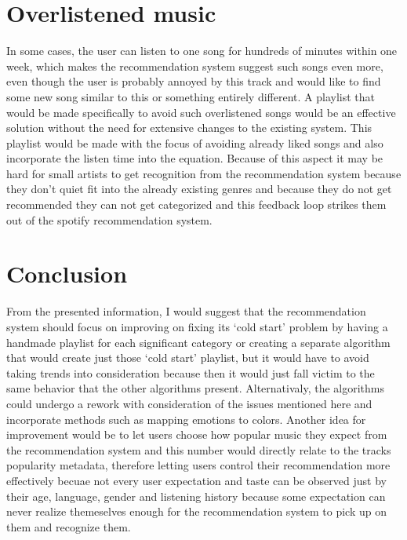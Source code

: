 \documentclass[10pt,twoside,slovak,a4paper]{article}
\begin{document}
\section{Overlistened music}
In some cases, the user can listen to one song for hundreds of minutes within one week, which makes the recommendation system suggest such songs even more, even though the user is probably annoyed by this track and would like to find some new song similar to this or something entirely different. A playlist that would be made specifically to avoid such overlistened songs would be an effective solution without the need for extensive changes to the existing system. This playlist would be made with the focus of avoiding already liked songs\cite{curtis2022quest} and also incorporate the listen time into the equation.
Because of this aspect it may be hard for small artists to get recognition from the recommendation system because they don't quiet fit into the already existing genres and because they do not get recommended they can not get categorized and this feedback loop strikes them out of the spotify recommendation system.

\section{Conclusion}\label{conclusion} %
From the presented information, I would suggest that the recommendation system should focus on improving on fixing its `cold start' problem by having a handmade playlist for each significant category or creating a separate algorithm that would create just those `cold start' playlist, but it would have to avoid taking trends into consideration because then it would just fall victim to the same behavior that the other algorithms present. Alternativaly, the algorithms could undergo a rework with consideration of the issues mentioned here and incorporate methods such as mapping emotions to colors\cite{dawson2021spotify}.
Another idea for improvement would be to let users choose how popular music they expect from the recommendation system and this number would directly relate to the tracks popularity metadata, therefore letting users control their recommendation more effectively becuae not every user expectation and taste can be observed just by their age, language, gender and listening history because some expectation can never realize themeselves enough for the recommendation system to pick up on them and recognize them.



\end{document}
